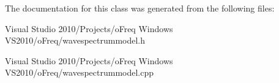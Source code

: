 The documentation for this class was generated from the following files\-:\begin{DoxyCompactItemize}
\item 
Visual Studio 2010/\-Projects/o\-Freq Windows V\-S2010/o\-Freq/wavespectrummodel.\-h\item 
Visual Studio 2010/\-Projects/o\-Freq Windows V\-S2010/o\-Freq/wavespectrummodel.\-cpp\end{DoxyCompactItemize}
